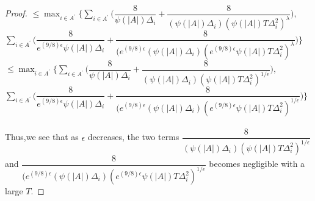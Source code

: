 \begin{proof}
\newline
$\leq \max_{i\in A^{'}}\bigg\lbrace\sum_{i\in A^{'}} \bigg(\dfrac{8}{\psi(|A|)\Delta_{i}} + \dfrac{8}{(\psi(|A|)\Delta_{i})(\psi(|A|)T\Delta_{i}^{2})^{\lambda}}\bigg), $
\newline\hspace*{6em}
$\sum_{i\in A^{'}}\bigg(\dfrac{8}{ e^{(9/8)\epsilon} \psi(|A|)\Delta_{i}} + \dfrac{8}{(e^{(9/8)\epsilon}(\psi(|A|)\Delta_{i})(e^{(9/8)\epsilon} \psi(|A|)T\Delta_{i}^{2})^{\lambda}}\bigg)\bigg\rbrace$
\newline
$\leq \max_{i\in A^{'}}\bigg\lbrace\sum_{i\in A^{'}} \bigg(\dfrac{8}{\psi(|A|)\Delta_{i}} + \dfrac{8}{(\psi(|A|)\Delta_{i})(\psi(|A|)T\Delta_{i}^{2})^{1/\epsilon}}\bigg),$
\newline\hspace*{6em} $\sum_{i\in A^{'}}\bigg(\dfrac{8}{ e^{(9/8)\epsilon} \psi(|A|)\Delta_{i}} + \dfrac{8}{(e^{(9/8)\epsilon}(\psi(|A|)\Delta_{i})(e^{(9/8)\epsilon} \psi(|A|)T\Delta_{i}^{2})^{1/\epsilon}}\bigg)\bigg\rbrace$
\newline
\paragraph*{}Thus,we see that as $\epsilon$ decreases, the two terms $\dfrac{8}{(\psi(|A|)\Delta_{i})(\psi(|A|)T\Delta_{i}^{2})^{1/\epsilon}}$ and 
\newline $\dfrac{8}{(e^{(9/8)\epsilon}(\psi(|A|)\Delta_{i})(e^{(9/8)\epsilon} \psi(|A|)T\Delta_{i}^{2})^{1/\epsilon}}$ becomes negligible with a large $T$. %


\end{proof}
